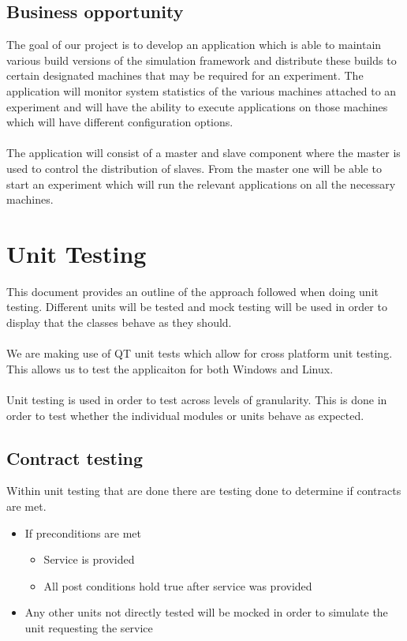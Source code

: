 \documentclass[a4paper,12pt,final]{article}
\begin{document}
\subsection{Business opportunity}
The goal of our project is to develop an application which is able to maintain
various build versions of the simulation framework and distribute these builds
to certain designated machines that may be required for an experiment. The
application will monitor system statistics of the various machines attached
to an experiment and will have the ability to execute applications on those
machines which will have different configuration options.\\
\textbf{\\}
The application will consist of a master and slave component where the
master is used to control the distribution of slaves. From the master one will
be able to start an experiment which will run the relevant applications on all
the necessary machines.



\newpage
\section{Unit Testing}
This document provides an outline of the approach followed when doing unit testing. Different units will be tested and mock testing will be used in order to display that the classes behave as they should.\\
\textbf{\\}
We are making use of QT unit tests which allow for cross platform unit testing. This allows us to test the applicaiton for both Windows and Linux.\\
\textbf{\\}
Unit testing is used in order to test across levels of granularity. This is done in order to test whether the individual modules or units behave as expected.
\subsection{Contract testing}
Within unit testing that are done there are testing done to determine if contracts are met. 
\begin{itemize}
\item If preconditions are met
\begin{itemize}
\item Service is provided
\item All post conditions hold true after service was provided
\end{itemize}
\item Any other units not directly tested will be mocked in order to simulate the unit requesting the service
\end{itemize}
\end{document}
